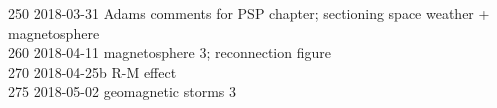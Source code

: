 \begin{footnotesize}
250	2018-03-31	Adams comments for PSP chapter; sectioning space weather + magnetosphere\\
260	2018-04-11	magnetosphere 3; reconnection figure\\
270	2018-04-25b	R-M effect\\
275	2018-05-02	geomagnetic storms 3\\

\end{footnotesize}
